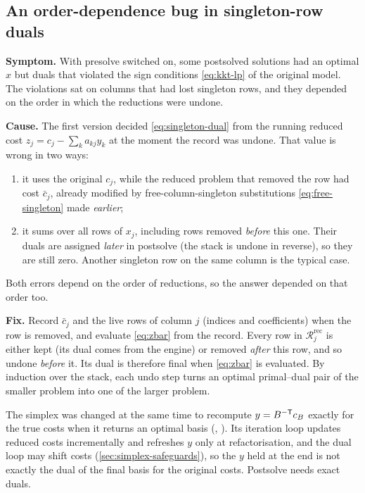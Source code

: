 \subsection{An order-dependence bug in singleton-row duals}\label{sec:presolve-bug}
\begin{lessonbox}
\textbf{Symptom.} With presolve switched on, some postsolved solutions had an optimal $x$ but duals
that violated the sign conditions \eqref{eq:kkt-lp} of the original model. The violations sat on
columns that had lost singleton rows, and they depended on the order in which the reductions were
undone.

\textbf{Cause.} The first version decided \eqref{eq:singleton-dual} from the running reduced cost
$z_j = c_j - \sum_k a_{kj}y_k$ at the moment the record was undone. That value is wrong in two ways:
\begin{enumerate}[leftmargin=1.4em]
  \item it uses the original $c_j$, while the reduced problem that removed the row had cost
        $\bar c_j$, already modified by free-column-singleton substitutions
        \eqref{eq:free-singleton} made \emph{earlier};
  \item it sums over all rows of $x_j$, including rows removed \emph{before} this one. Their duals
        are assigned \emph{later} in postsolve (the stack is undone in reverse), so they are still
        zero. Another singleton row on the same column is the typical case.
\end{enumerate}
Both errors depend on the order of reductions, so the answer depended on that order too.

\textbf{Fix.} Record $\bar c_j$ and the live rows of column $j$ (indices and coefficients) when
the row is removed, and evaluate \eqref{eq:zbar} from the record. Every row in
$\mathcal{R}_j^{\text{rec}}$ is either kept (its dual comes from the engine) or removed
\emph{after} this row, and so undone \emph{before} it. Its dual is therefore final when
\eqref{eq:zbar} is evaluated. By induction over the stack, each undo step turns an optimal
primal--dual pair of the smaller problem into one of the larger problem.
\end{lessonbox}

The simplex was changed at the same time to recompute $y=B^{-\mathsf{T}} c_B$ exactly for the true costs
when it returns an optimal basis (, ). Its iteration loop
updates reduced costs incrementally and refreshes $y$ only at refactorisation, and the dual
loop may shift costs (\cref{sec:simplex-safeguards}), so the $y$ held at the end is not exactly the
dual of the final basis for the original costs. Postsolve needs exact duals.

